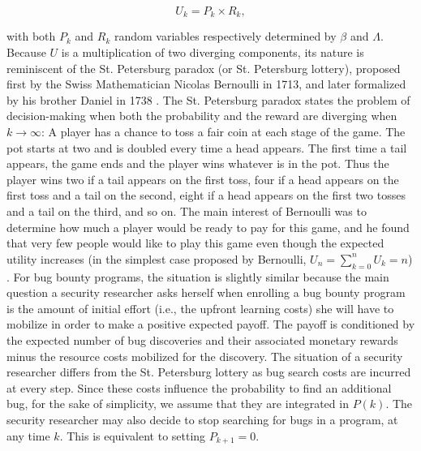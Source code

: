 \begin{equation}
\label{ }
U_k = P_k \times R_k,
\end{equation}

\noindent with both $P_k$ and $R_k$ random variables respectively determined by $\beta$ and $\Lambda$. Because $U$ is a multiplication of two diverging components, its nature is reminiscent of the St. Petersburg paradox (or St. Petersburg lottery), proposed first by the Swiss Mathematician Nicolas Bernoulli in 1713, and later formalized by his brother Daniel in 1738 \cite{bernoulli1954exposition}.  The St. Petersburg paradox states the problem of decision-making when both the probability and the reward are diverging when $k \rightarrow \infty$: A player has a chance to toss a fair coin at each stage of the game. The pot starts at two and is doubled every time a head appears. The first time a tail appears, the game ends and the player wins whatever is in the pot. Thus the player wins two if a tail appears on the first toss, four if a head appears on the first toss and a tail on the second, eight if a head appears on the first two tosses and a tail on the third, and so on. The main interest of Bernoulli was to determine how much a player would be ready to pay for this game, and he found that very few people would like to play this game even though the expected utility increases (in the simplest case proposed by Bernoulli, $U_n = \sum_{k=0}^{n} U_k = n$) \cite{bernoulli1954exposition}. For bug bounty programs, the situation is slightly similar because the main question a security researcher asks herself when enrolling a bug bounty program is the amount of initial effort (i.e., the upfront learning costs) she will have to mobilize in order to make a positive expected payoff. The payoff is conditioned by the expected number of bug discoveries and their associated monetary rewards minus the resource costs mobilized for the discovery. The situation of a security researcher differs from the St. Petersburg lottery as bug search costs are incurred at every step. Since these costs influence the probability to find an additional bug, for the sake of simplicity, we assume that they are integrated in $P(k)$. The security researcher may also decide to stop searching for bugs in a program, at any time $k$. This is equivalent to setting $P_{k+1} = 0$.\\


